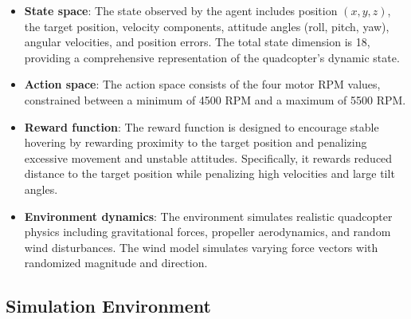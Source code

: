 \documentclass[12pt]{article}
\begin{document}
\begin{itemize}
    \item \textbf{State space}: The state observed by the agent includes position $(x, y, z)$, the target position, velocity components, attitude angles (roll, pitch, yaw), angular velocities, and position errors. The total state dimension is 18, providing a comprehensive representation of the quadcopter's dynamic state.
    
    \item \textbf{Action space}: The action space consists of the four motor RPM values, constrained between a minimum of 4500 RPM and a maximum of 5500 RPM.
    
    \item \textbf{Reward function}: The reward function is designed to encourage stable hovering by rewarding proximity to the target position and penalizing excessive movement and unstable attitudes. Specifically, it rewards reduced distance to the target position while penalizing high velocities and large tilt angles.
    
    \item \textbf{Environment dynamics}: The environment simulates realistic quadcopter physics including gravitational forces, propeller aerodynamics, and random wind disturbances. The wind model simulates varying force vectors with randomized magnitude and direction.
\end{itemize}

%     
%     
%     

\subsection{Simulation Environment}
\end{document}
